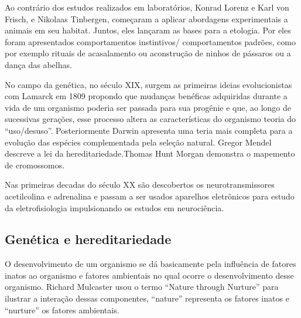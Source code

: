 \documentclass[
	article,			%
	12pt,				%
	oneside,			%
	a4paper,			%
	english,			%
	brazil,				%
	sumario=tradicional
	]{abntex2}
\begin{document}
Ao contrário dos estudos realizados em laboratórios, Konrad Lorenz e Karl von Frisch, e Nikolaas Tinbergen, começaram a aplicar abordagens experimentais a animais em seu habitat. Juntos, eles lançaram as bases para a etologia.%
Por eles foram apresentados comportamentos instintivos/ comportamentos padrões, como por exemplo rituais de acasalamento ou aconstrução de ninhos de pássaros ou a dança das abelhas.

No campo da genética, no século XIX, surgem as primeiras ideias evolucionistas com Lamarck em 1809 propondo que mudanças benéficas adquiridas durante a vida de um organismo poderia ser passada para sua progênie e que, ao longo de sucessivas gerações, esse processo altera as características do organismo teoria do ``uso/desuso''. Posteriormente Darwin apresenta uma teria mais completa para a evolução das espécies complementada pela seleção natural.
Gregor	Mendel descreve a lei da hereditariedade.Thomas Hunt Morgan demonstra o mapemento de cromossomos.

Nas primeiras decadas do século XX são descobertos os neurotransmissores acetilcolina e adrenalina e passam a ser usados aparelhos eletrônicos para estudo da eletrofisiologia impulsionando os estudos em neurociência.

\subsection{Genética e hereditariedade}


O desenvolvimento de um organismo se dá basicamente pela influência de fatores inatos ao organismo e fatores ambientais no qual ocorre o desenvolvimento desse organismo. Richard Mulcaster usou o termo ``Nature through Nurture'' para ilustrar a interação dessas componentes, ``nature'' representa os fatores inatos e ``nurture'' os fatores ambientais.
\end{document}
